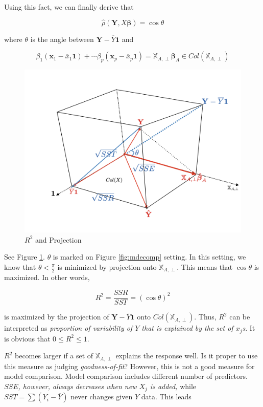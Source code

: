 \documentclass[]{book}
\theoremstyle{definition}
\theoremstyle{definition}
\theoremstyle{definition}
\theoremstyle{remark}
\begin{document}
Using this fact, we can finally derive that

\begin{equation}
  \hat\rho(\mathbf{Y}, X\boldsymbol\beta) = \cos\theta
  \label{eq:rsqangle}
\end{equation}

where \(\theta\) is the angle between \(\mathbf{Y} - \overline{Y}\mathbf{1}\) and

\[\beta_1(\mathbf{x}_1 - \overline{x}_1\mathbf{1}) + \cdots \beta_p(\mathbf{x}_p - \overline{x}_p\mathbf{1}) = \mathbb{X}_{A,\perp} \boldsymbol\beta_A \in Col(\mathbb{X}_{A, \perp})\]

\begin{figure}[H]

{\centering \includegraphics[width=0.7\linewidth]{images/multiple-rsq} 

}

\caption{$R^2$ and Projection}\label{fig:rsqfig}
\end{figure}

See Figure \ref{fig:rsqfig}. \(\theta\) is marked on Figure \ref{fig:mdecomp} setting. In this setting, we know that \(\theta < \frac{\pi}{2}\) is minimized by projection onto \(\mathbb{X}_{A,\perp}\). This means that \(\cos\theta\) is maximized. In other words,

\[R^2 = \frac{SSR}{SST} = (\cos\theta)^2\]

is maximized by the projection of \(\mathbf{Y} - \overline{Y}\mathbf{1}\) onto \(Col(\mathbb{X}_{A, \perp})\). Thus, \(R^2\) can be interpreted as \emph{proportion of variability of \(Y\) that is explained by the set of \(x_j\)s}. It is obvious that \(0 \le R^2 \le 1\).

\(R^2\) becomes larger if a set of \(\mathbb{X}_{A, \perp}\) explains the response well. Is it proper to use this measure as judging \emph{goodness-of-fit}? However, this is not a good measure for model comparison. Model comparison includes different number of predictors. \emph{\(SSE\), however, always decreases when new \(X_j\) is added,} while \(SST = \sum (Y_i - \overline{Y})\) never changes given \(Y\) data. This leads
\end{document}
